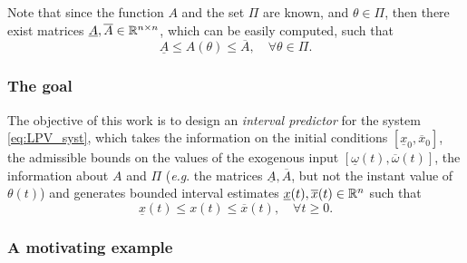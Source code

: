 Note that since the function $A$ and the set $\Pi$ are known, and $\theta\in\Pi$, then there exist matrices $\underline{A},\overline{A}\in\mathbb{R}^{n\times n}$, which can be easily computed, such that 
\[
\underline{A}\leq A(\theta)\leq\overline{A},\quad\forall\theta\in\Pi.
\]

\subsubsection{The goal}

The objective of this work is to design an \emph{interval predictor} for the system \eqref{eq:LPV_syst}, which takes the information on the initial conditions $[\underline{x}_{0},\overline{x}_{0}]$, the admissible bounds on the values of the exogenous input $[\underline{\omega}(t),\overline{\omega}(t)]$, the information about $A$ and $\Pi$ (\emph{e.g}. the matrices $\underline{A},\overline{A}$, but not the instant value of $\theta(t)$) and generates bounded interval estimates $\underline{x}(t),\overline{x}(t)\in\mathbb{R}^{n}$ such that
\begin{equation}
\underline{x}(t)\leq x(t)\leq\overline{x}(t),\quad\forall t\geq0.\label{eq:inclusion-property}
\end{equation}

\subsubsection{A motivating example}

